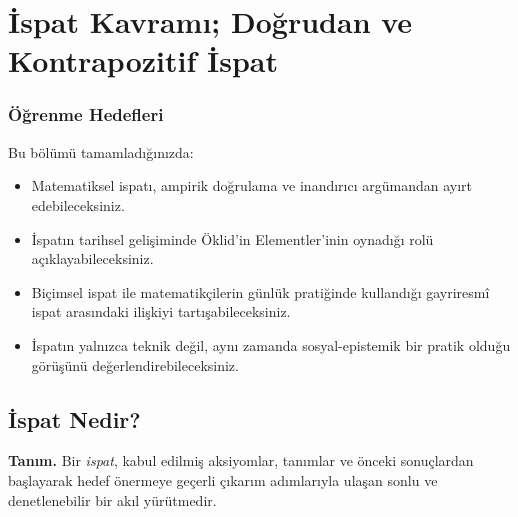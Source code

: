 \chapter{İspat Kavramı; Doğrudan ve Kontrapozitif İspat}
\label{chap:dogrudan-ispat}


\subsection*{Öğrenme Hedefleri}

Bu bölümü tamamladığınızda:

\begin{itemize}\setlength{\itemsep}{2pt}\setlength{\parskip}{0pt}
\item Matematiksel ispatı, ampirik doğrulama ve inandırıcı argümandan ayırt edebileceksiniz.
\item İspatın tarihsel gelişiminde Öklid’in Elementler’inin oynadığı rolü açıklayabileceksiniz.
\item Biçimsel ispat ile matematikçilerin günlük pratiğinde kullandığı gayriresmî ispat arasındaki ilişkiyi tartışabileceksiniz.
\item İspatın yalnızca teknik değil, aynı zamanda sosyal-epistemik bir pratik olduğu görüşünü değerlendirebileceksiniz.
\end{itemize}

\section{İspat Nedir?}

\begin{tcolorbox}[bookbox,colback=cDef]
\textbf{\textsf{\textcolor{cAcc}{Tanım.}}}\quad
Bir \emph{ispat}, kabul edilmiş aksiyomlar, tanımlar ve önceki sonuçlardan başlayarak hedef önermeye geçerli çıkarım adımlarıyla ulaşan sonlu ve denetlenebilir bir akıl yürütmedir.
\end{tcolorbox}

